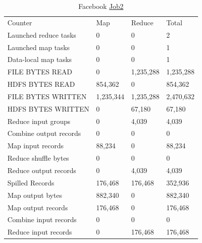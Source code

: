 \documentclass[paper=a4, fontsize=11pt]{scrartcl}	%
\numberwithin{equation}{section}															%
\numberwithin{figure}{section}																%
\numberwithin{table}{section}																%
\begin{document}
\begin{table}[!h]
	\centering
	\caption{Facebook \href{http://hadoop-compute0.di.univr.it:50030/jobdetails.jsp?jobid=job_201603141010_12302}{Job2}}
	\label{my-label}
	\begin{tabular}{llll}
		Counter&	Map&	Reduce&	Total\\
		Launched reduce tasks&	0&	0&	2\\
		Launched map tasks&	0&	0&	1\\
		Data-local map tasks&	0&	0&	1\\
		FILE BYTES READ&	0&	1,235,288&	1,235,288\\
		HDFS BYTES READ&	854,362&	0&	854,362\\
		FILE BYTES WRITTEN&	1,235,344&	1,235,288&	2,470,632\\
		HDFS BYTES WRITTEN&	0&	67,180&	67,180\\
		Reduce input groups&	0&	4,039&	4,039\\
		Combine output records&	0&	0&	0\\
		Map input records&	88,234&	0&	88,234\\
		Reduce shuffle bytes&	0&	0&	0\\
		Reduce output records&	0&	4,039&	4,039\\
		Spilled Records&	176,468&	176,468&	352,936\\
		Map output bytes&	882,340&	0&	882,340\\
		Map output records&	176,468&	0&	176,468\\
		Combine input records&	0&	0&	0\\
		Reduce input records&	0&	176,468&	176,468\\
	\end{tabular}
\end{table}
\end{document}
